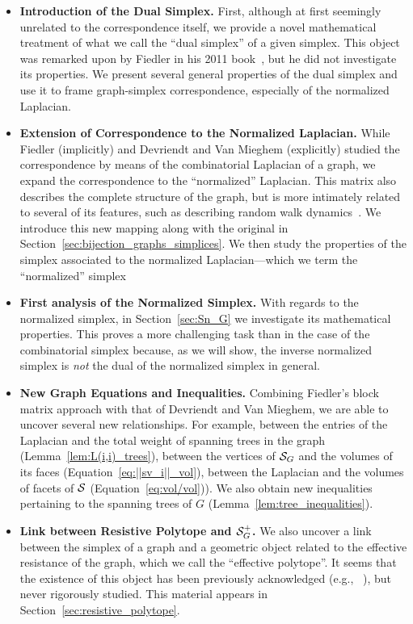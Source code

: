 \begin{itemize}
	\item {\bf Introduction of the Dual Simplex.} First, although at first seemingly unrelated to the correspondence itself, we provide a  novel mathematical treatment of what we call the ``dual simplex'' of a given simplex. This object was remarked upon by Fiedler in his 2011 book~\cite{fiedler2011matrices}, but he did not investigate its properties. We present several general properties of  the dual simplex and use it to frame graph-simplex correspondence, especially of the normalized Laplacian. 
	\item {\bf Extension of Correspondence to the Normalized Laplacian. }While Fiedler (implicitly) and Devriendt and Van Mieghem (explicitly) studied the correspondence by means of the combinatorial Laplacian of a graph, we expand the correspondence to the ``normalized'' Laplacian.  This matrix also describes the complete structure of the graph, but is more intimately related to several of its features, such as describing random walk dynamics~\cite{chung1997spectral}. We introduce this new mapping  along with the original in Section~\ref{sec:bijection_graphs_simplices}. 
	We then study the properties of the simplex associated to the normalized Laplacian---which we term the ``normalized'' simplex   
	\item {\bf First analysis of the Normalized Simplex. } With regards to the normalized simplex, in Section~\ref{sec:Sn_G} we investigate its mathematical properties. This proves a more challenging task   than  in  the case of the combinatorial simplex because, as we will show, the inverse normalized simplex  is \emph{not} the dual of the normalized  simplex in general. 
	\item {\bf New Graph Equations and Inequalities.} Combining Fiedler's block matrix approach with that of Devriendt and Van Mieghem, we are able to uncover several new relationships. For example, between the  entries of the Laplacian and the total  weight of spanning trees in  the graph (Lemma~\ref{lem:L(i,i)_trees}), between the vertices of $\mathcal{S}_G$  and the volumes of its faces (Equation~\eqref{eq:||sv_i||_vol}), between the Laplacian and the volumes of facets of $\mathcal{S}$ (Equation~\eqref{eq:vol/vol})). We also  obtain new inequalities pertaining to the spanning trees of $G$ (Lemma~\ref{lem:tree_inequalities}). 
	\item {\bf Link between Resistive Polytope and $\mathcal{S}_G^+$.} We also uncover a link between the simplex of a graph and a geometric  object related to the effective resistance of the graph, which we call the ``effective polytope''. It seems that the existence of this object has been previously acknowledged (e.g., ~\cite{shayanNotes}), but never rigorously studied. This material appears in Section~\ref{sec:resistive_polytope}. 

\end{itemize}

